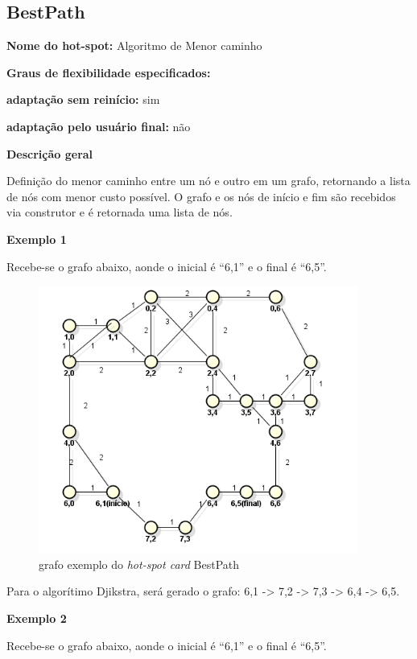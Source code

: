 \begin{apendicesenv}
\section{BestPath}

{\large \textbf{Nome do hot-spot:}} Algoritmo de Menor caminho

{\large \textbf{Graus de flexibilidade especificados:}}

\textbf{adaptação sem reinício:} sim

\textbf{adaptação pelo usuário final:} não

{\large \textbf{Descrição geral}}

Definição do menor caminho entre um nó e outro em um grafo, retornando a lista de nós com menor custo possível. O grafo e os nós de início e fim são recebidos via construtor e é retornada uma lista de nós.

{\large \textbf{Exemplo 1}}

Recebe-se o grafo abaixo, aonde o inicial é “6,1” e o final é “6,5”.

\begin{figure}[H]
	\centering
	\label{fig55}
		\includegraphics[keepaspectratio=true,scale=0.7]{figuras/grafohotspotcard1.PNG}
	\caption{grafo exemplo do \textit{hot-spot card} BestPath}
\end{figure}

Para o algorítimo Djikstra, será gerado o grafo: 6,1 -> 7,2 -> 7,3 -> 6,4 -> 6,5.

{\large \textbf{Exemplo 2}}

Recebe-se o grafo abaixo, aonde o inicial é “6,1” e o final é “6,5”.


\end{apendicesenv}
